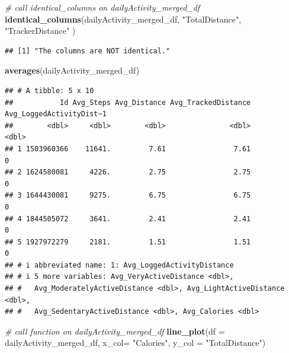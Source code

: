 \documentclass[
]{article}
\newenvironment{Shaded}{\begin{snugshade}}{\end{snugshade}}
\newcommand{\AttributeTok}[1]{\textcolor[rgb]{0.13,0.29,0.53}{#1}}
\newcommand{\CommentTok}[1]{\textcolor[rgb]{0.56,0.35,0.01}{\textit{#1}}}
\newcommand{\FunctionTok}[1]{\textcolor[rgb]{0.13,0.29,0.53}{\textbf{#1}}}
\newcommand{\NormalTok}[1]{#1}
\newcommand{\StringTok}[1]{\textcolor[rgb]{0.31,0.60,0.02}{#1}}
\begin{document}
\begin{Shaded}
\begin{Highlighting}[]
\CommentTok{\# call identical\_columns on dailyActivity\_merged\_df}
\FunctionTok{identical\_columns}\NormalTok{(dailyActivity\_merged\_df, }\StringTok{"TotalDistance"}\NormalTok{, }\StringTok{"TrackerDistance"}\NormalTok{ )}
\end{Highlighting}
\end{Shaded}

\begin{verbatim}
## [1] "The columns are NOT identical."
\end{verbatim}

\begin{Shaded}
\begin{Highlighting}[]
\FunctionTok{averages}\NormalTok{(dailyActivity\_merged\_df)}
\end{Highlighting}
\end{Shaded}

\begin{verbatim}
## # A tibble: 5 x 10
##           Id Avg_Steps Avg_Distance Avg_TrackedDistance Avg_LoggedActivityDist~1
##        <dbl>     <dbl>        <dbl>               <dbl>                    <dbl>
## 1 1503960366    11641.         7.61                7.61                        0
## 2 1624580081     4226.         2.75                2.75                        0
## 3 1644430081     9275.         6.75                6.75                        0
## 4 1844505072     3641.         2.41                2.41                        0
## 5 1927972279     2181.         1.51                1.51                        0
## # i abbreviated name: 1: Avg_LoggedActivityDistance
## # i 5 more variables: Avg_VeryActiveDistance <dbl>,
## #   Avg_ModeratelyActiveDistance <dbl>, Avg_LightActiveDistance <dbl>,
## #   Avg_SedentaryActiveDistance <dbl>, Avg_Calories <dbl>
\end{verbatim}

\begin{Shaded}
\begin{Highlighting}[]
\CommentTok{\# call function on dailyActivity\_merged\_df }
\FunctionTok{line\_plot}\NormalTok{(}\AttributeTok{df =}\NormalTok{ dailyActivity\_merged\_df, }\AttributeTok{x\_col=} \StringTok{"Calories"}\NormalTok{, }\AttributeTok{y\_col =} \StringTok{"TotalDistance"}\NormalTok{)}
\end{Highlighting}
\end{Shaded}
\end{document}
